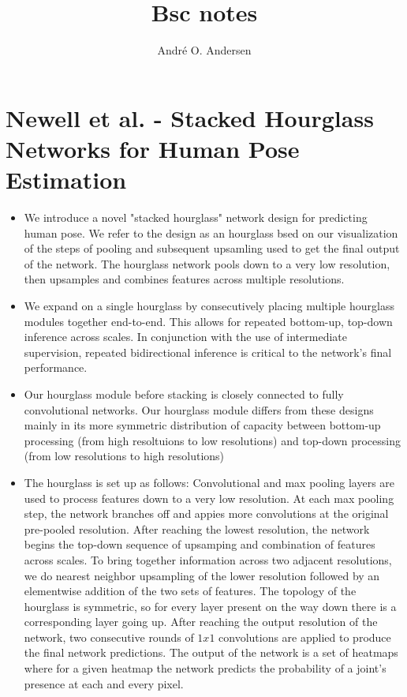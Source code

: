 \documentclass{report}
\title{Bsc notes}
\author{André O. Andersen}
\begin{document}
\maketitle

\section*{Newell et al. - Stacked Hourglass Networks for Human Pose Estimation}
\begin{itemize}
    \item We introduce a novel "stacked hourglass" network design for predicting human pose. We refer to the design as an hourglass bsed on our visualization of the steps of pooling and subsequent upsamling used to get the final output of the network. The hourglass network pools down to a very low resolution, then upsamples and combines features across multiple resolutions.
    \item We expand on a single hourglass by consecutively placing multiple hourglass modules together end-to-end. This allows for repeated bottom-up, top-down inference across scales. In conjunction with the use of intermediate supervision, repeated bidirectional inference is critical to the network's final performance. 
    \item Our hourglass module before stacking is closely connected to fully convolutional networks. Our hourglass module differs from these designs mainly in its more symmetric distribution of capacity between bottom-up processing (from high resoltuions to low resolutions) and top-down processing (from low resolutions to high resolutions)
    \item The hourglass is set up as follows: Convolutional and max pooling layers are used to process features down to a very low resolution. At each max pooling step, the network branches off and appies more convolutions at the original pre-pooled resolution. After reaching the lowest resolution, the network begins the top-down sequence of upsamping and combination of features across scales. To bring together information across two adjacent resolutions, we do nearest neighbor upsampling of the lower resolution followed by an elementwise addition of the two sets of features. The topology of the hourglass is symmetric, so for every layer present on the way down there is a corresponding layer going up. After reaching the output resolution of the network, two consecutive rounds of $1x1$ convolutions are applied to produce the final network predictions. The output of the network is a set of heatmaps where for a given heatmap the network predicts the probability of a joint's presence at each and every pixel.

\end{itemize}
\end{document}
